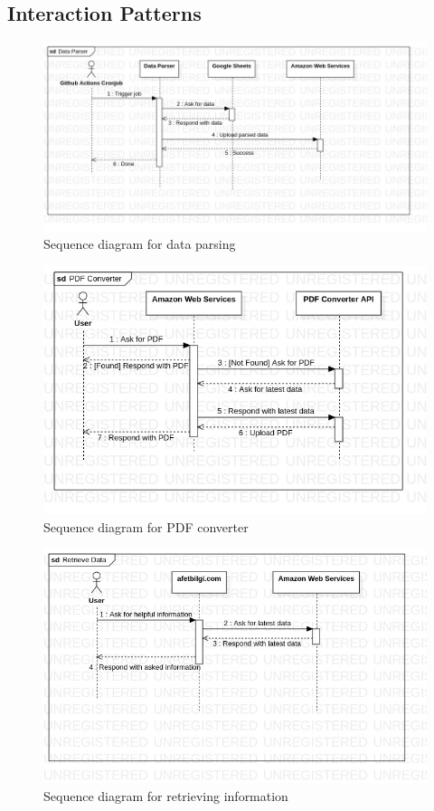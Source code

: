 \documentclass[12pt]{report}
\begin{document}
\subsection{Interaction Patterns}

\begin{figure}[H]
    \includegraphics[scale=0.6]{seq1.jpg}
    \centering
    \caption{Sequence diagram for data parsing}
\end{figure}


\begin{figure}[H]
    \includegraphics[scale=0.6]{seq2.jpg}
    \centering
    \caption{Sequence diagram for PDF converter}
\end{figure}

\begin{figure}[H]
    \includegraphics[scale=0.6]{seq3.jpg}
    \centering
    \caption{Sequence diagram for retrieving information}
\end{figure}
\end{document}

